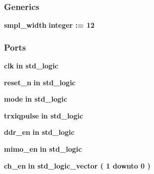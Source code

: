 \subsubsection*{Generics}
 \begin{DoxyCompactItemize}
\item 
{\bf smpl\+\_\+width} {\bfseries {\bfseries \textcolor{comment}{integer}\textcolor{vhdlchar}{ }\textcolor{vhdlchar}{ }\textcolor{vhdlchar}{\+:}\textcolor{vhdlchar}{=}\textcolor{vhdlchar}{ }\textcolor{vhdlchar}{ } \textcolor{vhdldigit}{12} \textcolor{vhdlchar}{ }}}
\end{DoxyCompactItemize}
\subsubsection*{Ports}
 \begin{DoxyCompactItemize}
\item 
{\bf clk}  {\bfseries {\bfseries \textcolor{keywordflow}{in}\textcolor{vhdlchar}{ }}} {\bfseries \textcolor{comment}{std\+\_\+logic}\textcolor{vhdlchar}{ }} 
\item 
{\bf reset\+\_\+n}  {\bfseries {\bfseries \textcolor{keywordflow}{in}\textcolor{vhdlchar}{ }}} {\bfseries \textcolor{comment}{std\+\_\+logic}\textcolor{vhdlchar}{ }} 
\item 
{\bf mode}  {\bfseries {\bfseries \textcolor{keywordflow}{in}\textcolor{vhdlchar}{ }}} {\bfseries \textcolor{comment}{std\+\_\+logic}\textcolor{vhdlchar}{ }} 
\item 
{\bf trxiqpulse}  {\bfseries {\bfseries \textcolor{keywordflow}{in}\textcolor{vhdlchar}{ }}} {\bfseries \textcolor{comment}{std\+\_\+logic}\textcolor{vhdlchar}{ }} 
\item 
{\bf ddr\+\_\+en}  {\bfseries {\bfseries \textcolor{keywordflow}{in}\textcolor{vhdlchar}{ }}} {\bfseries \textcolor{comment}{std\+\_\+logic}\textcolor{vhdlchar}{ }} 
\item 
{\bf mimo\+\_\+en}  {\bfseries {\bfseries \textcolor{keywordflow}{in}\textcolor{vhdlchar}{ }}} {\bfseries \textcolor{comment}{std\+\_\+logic}\textcolor{vhdlchar}{ }} 
\item 
{\bf ch\+\_\+en}  {\bfseries {\bfseries \textcolor{keywordflow}{in}\textcolor{vhdlchar}{ }}} {\bfseries \textcolor{comment}{std\+\_\+logic\+\_\+vector}\textcolor{vhdlchar}{ }\textcolor{vhdlchar}{(}\textcolor{vhdlchar}{ }\textcolor{vhdlchar}{ } \textcolor{vhdldigit}{1} \textcolor{vhdlchar}{ }\textcolor{keywordflow}{downto}\textcolor{vhdlchar}{ }\textcolor{vhdlchar}{ } \textcolor{vhdldigit}{0} \textcolor{vhdlchar}{ }\textcolor{vhdlchar}{)}\textcolor{vhdlchar}{ }} 

\end{DoxyCompactItemize}

